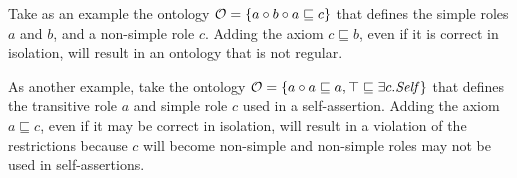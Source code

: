 
\begin{example}
Take as an example the ontology $\mathcal{O} = \{a \circ b \circ a \sqsubseteq c\}$ that defines the simple roles $a$ and $b$, and a non-simple role $c$. Adding the axiom $c \sqsubseteq b$, even if it is correct in isolation, will result in an ontology that is not regular.
\end{example}

\begin{example}
As another example, take the ontology $\mathcal{O} = \{a \circ a \sqsubseteq a, \top \sqsubseteq \exists c . \mathit{Self} \}$ that defines the transitive role $a$ and simple role $c$ used in a self-assertion. Adding the axiom $a \sqsubseteq c$, even if it may be correct in isolation, will result in a violation of the restrictions because $c$ will become non-simple and non-simple roles may not be used in self-assertions.
\end{example}


